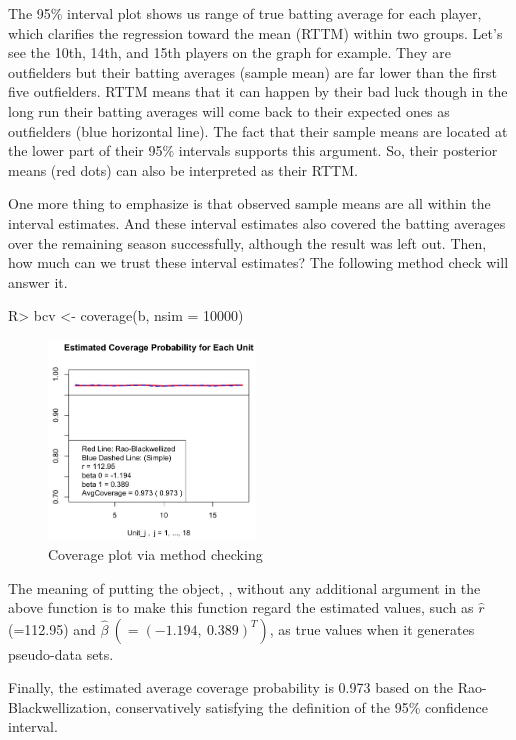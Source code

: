 \documentclass[article]{jss}
\begin{document}
The 95\% interval plot shows us range of true batting average for each player, which clarifies the regression toward the mean (RTTM) within two groups. Let's see the 10th, 14th, and 15th players on the graph for example. They are outfielders but their batting averages (sample mean) are far lower than the first five outfielders. RTTM means that it can happen by their bad luck though in the long run their batting averages will come back to their expected ones as outfielders (blue horizontal line). The fact that their sample means are located at the lower part of their 95\% intervals supports this argument. So, their posterior means (red dots) can also be interpreted as their RTTM. 


One more thing to emphasize is that observed sample means are all within the interval estimates. And these interval estimates also covered the batting averages over the remaining season successfully, although the result was left out. Then, how much can we trust these interval estimates? The following method check will answer it. 

\begin{CodeChunk}
\begin{CodeInput}
R> bcv <- coverage(b, nsim = 10000)
\end{CodeInput}
\end{CodeChunk}
\begin{figure}[h]
\begin{center}
\includegraphics[width = 5.5cm]{baseball2.png}
\caption{Coverage plot via method checking}
\end{center}
\end{figure}

The meaning of putting the  object, , without any additional argument in the above  function is to make this function regard the estimated values, such as $\hat{r}$ (=112.95) and $\hat{\beta}~(=(-1.194, ~0.389)^{T})$, as true values when it generates pseudo-data sets. 


Finally, the estimated average coverage probability is 0.973 based on the Rao-Blackwellization, conservatively satisfying the definition of the 95\% confidence interval. 
\end{document}
